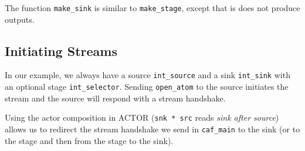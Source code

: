 The function \lstinline^make_sink^ is similar to \lstinline^make_stage^, except
that is does not produce outputs.

\clearpage

\subsection{Initiating Streams}


In our example, we always have a source \lstinline^int_source^ and a sink
\lstinline^int_sink^ with an optional stage \lstinline^int_selector^. Sending
\lstinline^open_atom^ to the source initiates the stream and the source will
respond with a stream handshake.

Using the actor composition in ACTOR (\lstinline^snk * src^ reads \emph{sink
after source}) allows us to redirect the stream handshake we send in
\lstinline^caf_main^ to the sink (or to the stage and then from the stage to
the sink).
